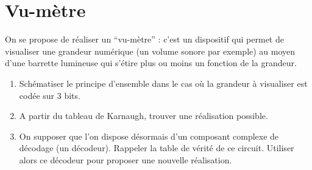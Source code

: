 \documentclass[a4paper,11pt]{article}
\begin{document}
\section{Vu-mètre}
On se propose de réaliser un ``vu-mètre'' : c'est un dispositif qui permet de visualiser une grandeur numérique (un volume sonore par exemple) au moyen d'une barrette lumineuse qui s'étire plus ou moins un fonction de la grandeur.
\begin{enumerate}
\item Schématiser le principe d'ensemble dans le cas où la grandeur à visualiser est codée sur 3 bits.
\item A partir du tableau de Karnaugh, trouver une réalisation possible.
\item On supposer que l'on dispose désormais d'un composant complexe de décodage (un décodeur). Rappeler la table de vérité de ce circuit. Utiliser alors ce décodeur pour proposer une nouvelle réalisation.
\end{enumerate}
\end{document}
